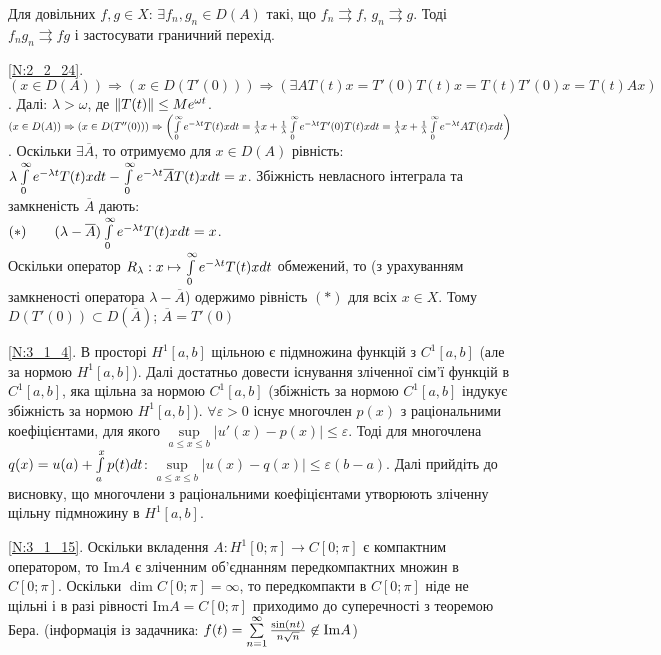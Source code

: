 Для довільних $f, g \in X$: $\exists f_n, g_n \in D(A)$ такі, що $f_n \rightrightarrows f$, 
$g_n \rightrightarrows g$. Тоді $f_n g_n \rightrightarrows fg$ і застосувати граничний перехід.

\noindent\ref{N:2_2_24}. $(x\in D(A)) \Rightarrow \left( x\in D(T'(0))\right)
\Rightarrow (\exists AT(t)x = T'(0)T(t)x = T(t)T'(0)x = T(t)Ax)$.
Далі: $\lambda > \omega$, де $\left\lVert T(t)\right\rVert \leq M e^{\omega t}$.
$(x\in D(A)) \Rightarrow
\left( x\in D(T''(0))\right)\Rightarrow \left( \int\limits_{0}^{\infty} e^{-\lambda t}T(t)x dt =
\frac{1}{\lambda}x + \frac{1}{\lambda} \int\limits_{0}^{\infty} e^{-\lambda t}T'(0)T(t)x dt =
\frac{1}{\lambda}x + \frac{1}{\lambda} \int\limits_{0}^{\infty} e^{-\lambda t}AT(t)x dt
\right)$.
Оскільки $\exists \overline{A}$, то отримуємо для $x \in D(A)$ рівність:
$\lambda \int\limits_{0}^{\infty} e^{-\lambda t}T(t)x dt - \int\limits_{0}^{\infty} e^{-\lambda t}\overline{A}T(t)x dt = x$.
Збіжність невласного інтеграла та замкненість $\overline{A}$ дають:\\
$(*)\qquad (\lambda - \overline{A})\int\limits_{0}^{\infty} e^{-\lambda t}T(t)x dt = x$.\\
Оскільки оператор
$R_\lambda: x \mapsto \int\limits_{0}^{\infty} e^{-\lambda t}T(t)x dt$ обмежений,
то (з урахуванням замкненості оператора $\lambda - \overline{A}$) одержимо рівність $(*)$
для всіх $x \in X$. Тому $D(T'(0))\subset D(\overline{A})$; $\overline{A} = T'(0)$

\noindent\ref{N:3_1_4}. В просторі $H^1[a,b]$ щільною є підмножина функцій з $C^1[a,b]$
(але за нормою $H^1[a,b]$). Далі достатньо довести існування зліченної сім'ї функцій в
$C^1[a,b]$, яка щільна за нормою $C^1[a,b]$ (збіжність за нормою $C^1[a,b]$ індукує
збіжність за нормою $H^1[a,b]$).
$\forall \varepsilon >0$ існує многочлен $p(x)$ з раціональними коефіцієнтами, для
якого $\sup\limits_{a\leq x\leq b}|u'(x)-p(x)| \leq \varepsilon$. Тоді для многочлена
$q(x) = u(a) + \int\limits_{a}^{x}p(t)dt$:\; $\sup\limits_{a\leq x \leq b}|u(x) - q(x)| \leq \varepsilon(b-a)$.
Далі прийдіть до висновку, що многочлени з раціональними коефіцієнтами утворюють зліченну
щільну підмножину в $H^1[a,b]$.

\noindent\ref{N:3_1_15}. Оскільки вкладення $A: H^1[0; \pi] \to C[0; \pi]$ є компактним
оператором, то $\mathrm{Im} A$ є зліченним об'єднанням передкомпактних множин в $C[0; \pi]$.
Оскільки $\dim C[0; \pi] = \infty$, то передкомпакти в $C[0; \pi]$ ніде не щільні і в разі
рівності $\mathrm{Im} A = C[0;\pi]$ приходимо до суперечності з теоремою Бера.
(інформація із задачника: $f(t) = \sum\limits_{n=1}^{\infty} \frac{\sin(nt)}{n\sqrt{n}} \not\in \mathrm{Im}A$)

